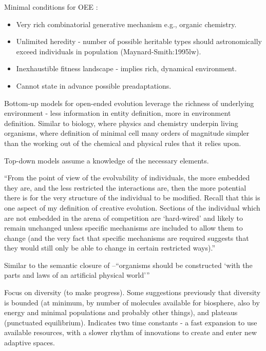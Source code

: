 Minimal conditions for OEE \parencite{Vasas2015}:
\begin{itemize}
	\item
	Very rich combinatorial generative mechanism e.g., organic chemistry.
	\item
	Unlimited heredity - number of possible heritable types should astronomically exceed individuals in population (Maynard-Smith:1995lw).
	\item
	Inexhaustible fitness landscape - implies rich, dynamical environment.
	\item
	Cannot state in advance possible preadaptations.
\end{itemize}

Bottom-up models for open-ended evolution leverage the richness of underlying environment - less information in entity definition, more in environment definition. Similar to biology, where physics and chemistry underpin living organisms, where definition of minimal cell many orders of magnitude simpler than the working out of the chemical and physical rules that it relies upon.

Top-down models assume a knowledge of the necessary elements.

``From the point of view of the evolvability of individuals, the more embedded they are, and the less restricted the interactions are, then the more potential there is for the very structure of the individual to be modified. Recall that this is one aspect of my definition of creative evolution. Sections of the individual which are not embedded in the arena of competition are `hard-wired' and
likely to remain unchanged unless specific mechanisms are included to allow them to change (and the very fact that specific mechanisms are required suggests that they would still only be able to change in certain restricted ways).'' \cite{Taylor2001}

Similar to the semantic closure of \cite{Pattee1995a}--``organisms should be constructed `with the parts and laws of an artificial physical world''' \cite{Taylor2001}

\parencite{Maley1999}

Focus on diversity (to make progress). Some suggestions previously that diversity is bounded (at minimum, by
number of molecules available for biosphere, also by energy and
minimal populations and probably other things), and plateaus
(punctuated equilibrium). Indicates two time constants - a fast expansion to use available resources, with a slower rhythm of innovations to create and enter new adaptive spaces.

